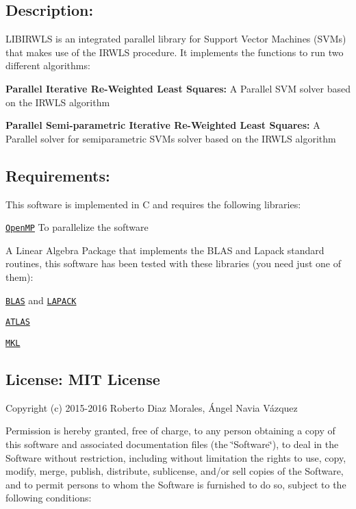 \subsection*{Description\+: }

L\+I\+B\+I\+R\+W\+LS is an integrated parallel library for Support Vector Machines (S\+V\+Ms) that makes use of the I\+R\+W\+LS procedure. It implements the functions to run two different algorithms\+:

{\bfseries Parallel Iterative Re-\/\+Weighted Least Squares\+:} A Parallel S\+VM solver based on the I\+R\+W\+LS algorithm

{\bfseries Parallel Semi-\/parametric Iterative Re-\/\+Weighted Least Squares\+:} A Parallel solver for semiparametric S\+V\+Ms solver based on the I\+R\+W\+LS algorithm

\subsection*{Requirements\+: }

This software is implemented in C and requires the following libraries\+:


\begin{DoxyItemize}
\item \href{http://openmp.org/wp/}{\tt Open\+MP} To parallelize the software
\item A Linear Algebra Package that implements the B\+L\+AS and Lapack standard routines, this software has been tested with these libraries (you need just one of them)\+:
\begin{DoxyItemize}
\item \href{http://www.netlib.org/blas/}{\tt B\+L\+AS} and \href{http://www.netlib.org/lapack/}{\tt L\+A\+P\+A\+CK}
\item \href{http://math-atlas.sourceforge.net/}{\tt A\+T\+L\+AS}
\item \href{https://software.intel.com/en-us/intel-mkl}{\tt M\+KL}
\end{DoxyItemize}
\end{DoxyItemize}

\subsection*{License\+: M\+IT License }

Copyright (c) 2015-\/2016 Roberto Diaz Morales, Ángel Navia Vázquez

Permission is hereby granted, free of charge, to any person obtaining a copy of this software and associated documentation files (the \char`\"{}\+Software\char`\"{}), to deal in the Software without restriction, including without limitation the rights to use, copy, modify, merge, publish, distribute, sublicense, and/or sell copies of the Software, and to permit persons to whom the Software is furnished to do so, subject to the following conditions\+:

